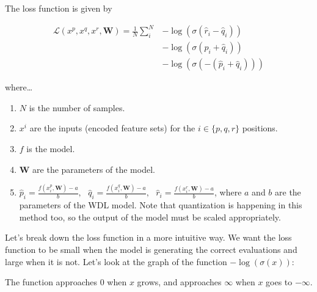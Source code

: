 The loss function is given by

\begin{align*}
\mathcal{L}(x^p, x^q, x^r, \bm{W})=
\frac{1}{N}
\sum_i^N
& -\log\left(\sigma(\hat{r}_i - \hat{q}_i)\right) \\
& -\log\left(\sigma(\hat{p}_i + \hat{q}_i)\right) \\
& -\log\left(\sigma(-(\hat{p}_i + \hat{q}_i))\right)
\end{align*}

where\dots

\begin{enumerate}
\itemsep0em
\item $N$ is the number of samples.
\item $x^i$ are the inputs (encoded feature sets) for the $i \in \{p,q,r\}$ positions.
\item $f$ is the model.
\item $\bm{W}$ are the parameters of the model.
\item $
\hat{p}_i = \frac{f(x^p_i, \bm{W}) - a}{b},\text{ }
\hat{q}_i = \frac{f(x^q_i, \bm{W}) - a}{b},\text{ }
\hat{r}_i = \frac{f(x^r_i, \bm{W}) - a}{b}
$, where $a$ and $b$ are the parameters of the WDL model. Note that quantization is happening in this method too, so the output of the model must be scaled appropriately.
\end{enumerate}



Let's break down the loss function in a more intuitive way. We want the loss function to be small when the model is generating the correct evaluations and large when it is not. Let's look at the graph of the function $-\log(\sigma(x))$:

\begin{figure}[H]
\centering
{}
\end{figure}

The function approaches 0 when $x$ grows, and approaches $\infty$ when $x$ goes to $-\infty$.

